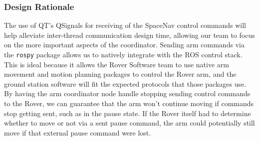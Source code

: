 \subsubsection{Design Rationale}
The use of QT's QSignals for receiving of the SpaceNav control commands will help alleviate inter-thread communication design time, allowing our team to focus on the more important aspects of the coordinator.
Sending arm commands via the \texttt{rospy} package allows us to natively integrate with the ROS control stack.
This is ideal because it allows the Rover Software team to use native arm movement and motion planning packages to control the Rover arm, and the ground station software will fit the expected protocols that those packages use.
By having the arm coordinator node handle stopping sending control commands to the Rover, we can guarantee that the arm won't continue moving if commands stop getting sent, such as in the pause state.
If the Rover itself had to determine whether to move or not via a sent pause command, the arm could potentially still move if that external pause command were lost.